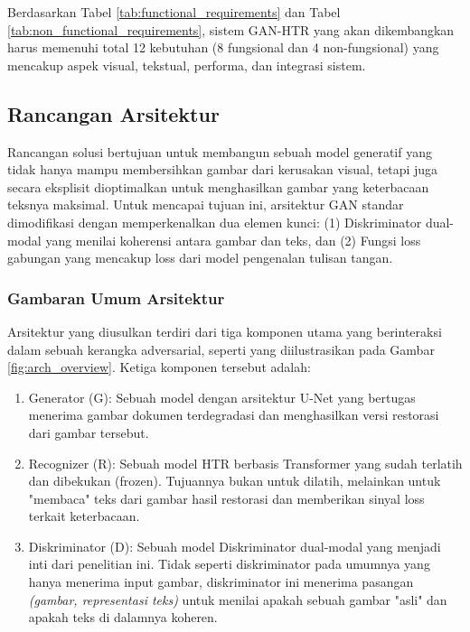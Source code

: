 \documentclass[12pt,a4paper]{article}
\begin{document}
Berdasarkan Tabel \ref{tab:functional_requirements} dan Tabel \ref{tab:non_functional_requirements}, sistem GAN-HTR yang akan dikembangkan harus memenuhi total 12 kebutuhan (8 fungsional dan 4 non-fungsional) yang mencakup aspek visual, tekstual, performa, dan integrasi sistem.

\subsection{Rancangan Arsitektur} %

Rancangan solusi bertujuan untuk membangun sebuah model generatif yang tidak hanya mampu membersihkan gambar dari kerusakan visual, tetapi juga secara eksplisit dioptimalkan untuk menghasilkan gambar yang keterbacaan teksnya maksimal. Untuk mencapai tujuan ini, arsitektur GAN standar dimodifikasi dengan memperkenalkan dua elemen kunci: (1) Diskriminator dual-modal yang menilai koherensi antara gambar dan teks, dan (2) Fungsi loss gabungan yang mencakup loss dari model pengenalan tulisan tangan.

\subsubsection{Gambaran Umum Arsitektur} %
Arsitektur yang diusulkan terdiri dari tiga komponen utama yang berinteraksi dalam sebuah kerangka adversarial, seperti yang diilustrasikan pada Gambar \ref{fig:arch_overview}. Ketiga komponen tersebut adalah:
\begin{enumerate}[nosep]
    \item Generator (G): Sebuah model dengan arsitektur U-Net yang bertugas menerima gambar dokumen terdegradasi dan menghasilkan versi restorasi dari gambar tersebut.
    \item Recognizer (R): Sebuah model HTR berbasis Transformer yang sudah terlatih dan dibekukan (frozen). Tujuannya bukan untuk dilatih, melainkan untuk "membaca" teks dari gambar hasil restorasi dan memberikan sinyal loss terkait keterbacaan.
    \item Diskriminator (D): Sebuah model Diskriminator dual-modal yang menjadi inti dari penelitian ini. Tidak seperti diskriminator pada umumnya yang hanya menerima input gambar, diskriminator ini menerima pasangan \textit{(gambar, representasi teks)} untuk menilai apakah sebuah gambar "asli" dan apakah teks di dalamnya koheren.
\end{enumerate}
\end{document}
